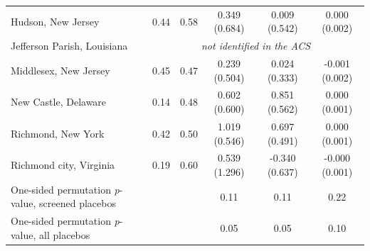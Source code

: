 \begin{tabular*}{\textwidth}{@{\extracolsep{\fill}}lccccc@{}}
Hudson, New Jersey & 0.44 & 0.58 & 0.349 (0.684) & 0.009 (0.542) & 0.000 (0.002) \\
Jefferson Parish, Louisiana & \multicolumn{5}{c}{\textit{not identified in the ACS}} \\
Middlesex, New Jersey & 0.45 & 0.47 & 0.239 (0.504) & 0.024 (0.333) & -0.001 (0.002) \\
New Castle, Delaware & 0.14 & 0.48 & 0.602 (0.600) & 0.851 (0.562) & 0.000 (0.001) \\
Richmond, New York & 0.42 & 0.50 & 1.019 (0.546) & 0.697 (0.491) & 0.000 (0.001) \\
Richmond city, Virginia & 0.19 & 0.60 & 0.539 (1.296) & -0.340 (0.637) & -0.000 (0.001) \\
\midrule
One-sided permutation \textit{p}-value, screened placebos & &  & 0.11 & 0.11 & 0.22 \\
One-sided permutation \textit{p}-value, all placebos & &  & 0.05 & 0.05 & 0.10 \\
\bottomrule
\end{tabular*}
